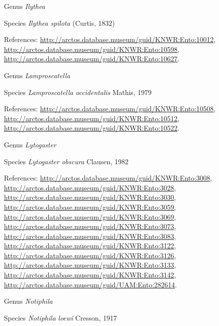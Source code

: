 \documentclass[9pt, article]{memoir}
\begin{document}
\begin{multicols}{2}
\vspace{6pt}\noindent\hspace{30pt}Genus \textit{Ilythea}


\vspace{6pt}\noindent\hspace{36pt}Species \textit{Ilythea spilota} (Curtis, 1832)


References: 
\url{http://arctos.database.museum/guid/KNWR:Ento:10012}, 
\url{http://arctos.database.museum/guid/KNWR:Ento:10598}, 
\url{http://arctos.database.museum/guid/KNWR:Ento:10627}.

\vspace{6pt}\noindent\hspace{30pt}Genus \textit{Lamproscatella}


\vspace{6pt}\noindent\hspace{36pt}Species \textit{Lamproscatella occidentalis} Mathis, 1979


References: 
\url{http://arctos.database.museum/guid/KNWR:Ento:10508}, 
\url{http://arctos.database.museum/guid/KNWR:Ento:10512}, 
\url{http://arctos.database.museum/guid/KNWR:Ento:10522}.

\vspace{6pt}\noindent\hspace{30pt}Genus \textit{Lytogaster}


\vspace{6pt}\noindent\hspace{36pt}Species \textit{Lytogaster obscura} Clausen, 1982


References: 
\url{http://arctos.database.museum/guid/KNWR:Ento:3008}, 
\url{http://arctos.database.museum/guid/KNWR:Ento:3028}, 
\url{http://arctos.database.museum/guid/KNWR:Ento:3030}, 
\url{http://arctos.database.museum/guid/KNWR:Ento:3059}, 
\url{http://arctos.database.museum/guid/KNWR:Ento:3069}, 
\url{http://arctos.database.museum/guid/KNWR:Ento:3073}, 
\url{http://arctos.database.museum/guid/KNWR:Ento:3083}, 
\url{http://arctos.database.museum/guid/KNWR:Ento:3122}, 
\url{http://arctos.database.museum/guid/KNWR:Ento:3126}, 
\url{http://arctos.database.museum/guid/KNWR:Ento:3133}, 
\url{http://arctos.database.museum/guid/KNWR:Ento:3142}, 
\url{http://arctos.database.museum/guid/UAM:Ento:282614}.

\vspace{6pt}\noindent\hspace{30pt}Genus \textit{Notiphila}


\vspace{6pt}\noindent\hspace{36pt}Species \textit{Notiphila loewi} Cresson, 1917



\end{multicols}
\end{document}
